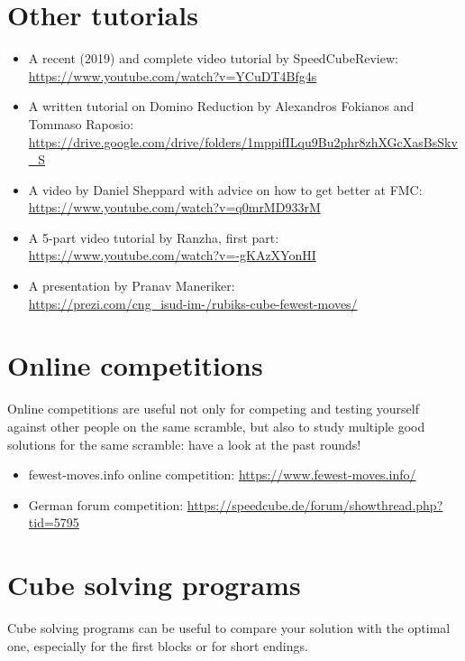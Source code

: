 \documentclass[11pt,a4paper]{book}
\begin{document}
\section*{Other tutorials}

\begin{itemize}
\item A recent (2019) and complete video tutorial by SpeedCubeReview: \url{https://www.youtube.com/watch?v=YCuDT4Bfg4s}
\item A written tutorial on Domino Reduction by Alexandros Fokianos and Tommaso Raposio: \url{https://drive.google.com/drive/folders/1mppifILqu9Bu2phr8zhXGcXasBsSkv_S}
\item A video by Daniel Sheppard with advice on how to get better at FMC: \url{https://www.youtube.com/watch?v=q0mrMD933rM}
\item A 5-part video tutorial by Ranzha, first part:\\ \url{https://www.youtube.com/watch?v=-gKAzXYonHI}
\item A presentation by Pranav Maneriker:\\ \url{https://prezi.com/cng_isud-im-/rubiks-cube-fewest-moves/}
\end{itemize}

\section*{Online competitions}

Online competitions are useful not only for competing and testing yourself against other people on the same scramble, but also to study multiple good solutions for the same scramble: have a look at the past rounds!

\begin{itemize}
\item fewest-moves.info online competition: \url{https://www.fewest-moves.info/}
\item German forum competition: \url{https://speedcube.de/forum/showthread.php?tid=5795}
\end{itemize}

\section*{Cube solving programs}

Cube solving programs can be useful to compare your solution with the optimal one, especially for the first blocks or for short endings.
\end{document}
